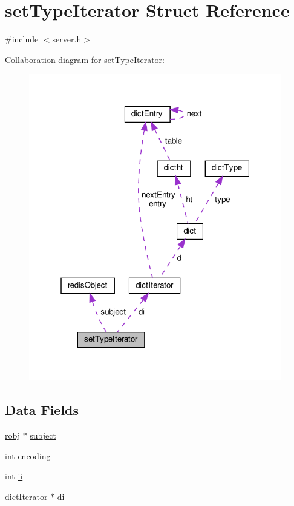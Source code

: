 \hypertarget{structset_type_iterator}{}\section{set\+Type\+Iterator Struct Reference}
\label{structset_type_iterator}


{\ttfamily \#include $<$server.\+h$>$}



Collaboration diagram for set\+Type\+Iterator\+:
\nopagebreak
\begin{figure}[H]
\begin{center}
\leavevmode
\includegraphics[width=313pt]{structset_type_iterator__coll__graph}
\end{center}
\end{figure}
\subsection*{Data Fields}
\begin{DoxyCompactItemize}
\item 
\hyperlink{server_8h_a540f174d2685422fbd7d12e3cd44c8e2}{robj} $\ast$ \hyperlink{structset_type_iterator_a8bd087874443f3e41cf5f728d8490693}{subject}
\item 
int \hyperlink{structset_type_iterator_ad1b45f33065aae3c757f56a692b25741}{encoding}
\item 
int \hyperlink{structset_type_iterator_aa5b6e783cf10163187df5705f0d82d47}{ii}
\item 
\hyperlink{structdict_iterator}{dict\+Iterator} $\ast$ \hyperlink{structset_type_iterator_a30e26ff2250d4d8b49241087d755342a}{di}
\end{DoxyCompactItemize}


